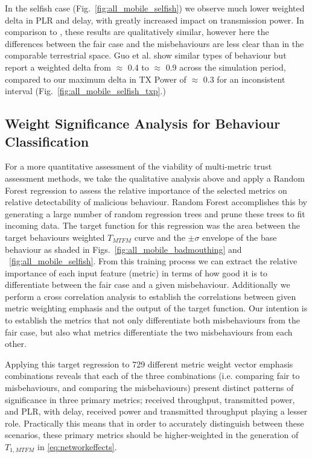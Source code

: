 In the selfish case (Fig.~\ref{fig:all_mobile_selfish}) we observe much lower weighted delta in PLR and delay, with greatly increased impact on transmission power.
In comparison to \cite{Guo11}, these results are qualitatively similar, however here the differences between the fair case and the misbehaviours are less clear than in the comparable terrestrial space.
Guo et al. show similar types of behaviour but report a weighted delta from $\approx$ 0.4 to $\approx$ 0.9 across the simulation period, compared to our maximum delta in TX Power of $\approx$ 0.3 for an inconsistent interval (Fig.~\ref{fig:all_mobile_selfish_txp}.)


\subsection{Weight Significance Analysis for Behaviour Classification}

For a more quantitative assessment of the viability of multi-metric trust assessment methods, we take the qualitative analysis above and apply a Random Forest regression \cite{Breiman2001} to assess the relative importance of the selected metrics on relative detectability of malicious behaviour. 
Random Forest accomplishes this by generating a large number of random regression trees and prune these trees to fit incoming data.
The target function for this regression was the area between the target behaviours weighted $T_{MTFM}$ curve and the $\pm\sigma$ envelope of the base behaviour as shaded in Figs.~\ref{fig:all_mobile_badmouthing} and ~\ref{fig:all_mobile_selfish}.
From this training process we can extract the relative importance of each input feature (metric) in terms of how good it is to differentiate between the fair case and a given misbehaviour.
Additionally we perform a cross correlation analysis to establish the correlations between given metric weighting emphasis and the output of the target function.
Our intention is to establish the metrics that not only differentiate both misbehaviours from the fair case, but also what metrics differentiate the two misbehaviours from each other.

Applying this target regression to 729 different metric weight vector emphasis combinations reveals that each of the three combinations (i.e. comparing fair to misbehaviours, and comparing the misbehaviours) present distinct patterns of significance in three primary metrics; received throughput, transmitted power, and PLR, with delay, received power and transmitted throughput playing a lesser role.
Practically this means that in order to accurately distinguish between these scenarios, these primary metrics should be higher-weighted in the generation of $T_{1,MTFM}$ in \eqref{eq:networkeffects}.

